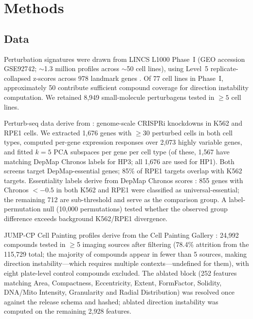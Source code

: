 \documentclass[11pt]{article}
\begin{document}
\section{Methods}

\subsection{Data}

Perturbation signatures were drawn from LINCS L1000 Phase~I (GEO accession
GSE92742; $\sim$1.3 million profiles across $\sim$50 cell lines),
using Level~5 replicate-collapsed z-scores across 978 landmark genes
\citep{subramanian2017next,keenan2018library}. Of 77 cell lines in Phase~I,
approximately 50 contribute sufficient compound coverage for direction
instability computation. We retained 8{,}949
small-molecule perturbagens tested in $\geq5$ cell lines.

Perturb-seq data derive from \citet{replogle2022mapping}: genome-scale
CRISPRi knockdowns in K562 and RPE1 cells. We extracted 1{,}676 genes
with $\geq$30 perturbed cells in both cell types, computed per-gene
expression responses over 2{,}073 highly variable genes, and fitted
$k = 5$ PCA subspaces per gene per cell type (of these, 1{,}567 have
matching DepMap Chronos labels for HP3; all 1{,}676 are used for HP1).
Both screens target DepMap-essential genes; 85\% of RPE1 targets overlap
with K562 targets. Essentiality labels derive from DepMap Chronos scores
\citep{dempster2021chronos}: 855 genes with Chronos $< -0.5$ in both
K562 and RPE1 were classified as universal-essential; the remaining 712
are sub-threshold and serve as the comparison group. A label-permutation
null (10{,}000 permutations) tested whether the observed group difference
exceeds background K562/RPE1 divergence.

JUMP-CP Cell Painting profiles derive from the Cell Painting Gallery
\citep{chandrasekaran2023jump}: 24{,}992 compounds tested in $\geq$5
imaging sources after filtering (78.4\% attrition from the 115{,}729
total; the majority of compounds appear in fewer than 5 sources,
making direction instability---which requires multiple
contexts---undefined for them), with eight plate-level control compounds
excluded. The ablated block (252 features matching Area, Compactness,
Eccentricity, Extent, FormFactor, Solidity, DNA/Mito Intensity,
Granularity and Radial Distribution) was resolved once against the release
schema and hashed; ablated direction instability was computed
on the remaining 2{,}928 features.
\end{document}
